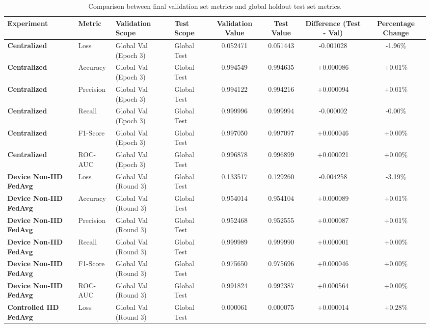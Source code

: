 \documentclass[11pt,a4paper]{article}
\begin{document}
\begin{table}[htbp]
\centering
\caption{Comparison between final validation set metrics and global holdout test set metrics.}
\begin{adjustbox}{width=\textwidth,center}
\begin{tabular}{l l l l c c c c}
\toprule
\textbf{Experiment} & \textbf{Metric} & \textbf{Validation Scope} & \textbf{Test Scope} & \textbf{Validation Value} & \textbf{Test Value} & \textbf{Difference (Test - Val)} & \textbf{Percentage Change} \\
\midrule
\textbf{Centralized} & Loss & Global Val (Epoch 3) & Global Test & 0.052471 & 0.051443 & -0.001028 & -1.96\% \\
\textbf{Centralized} & Accuracy & Global Val (Epoch 3) & Global Test & 0.994549 & 0.994635 & +0.000086 & +0.01\% \\
\textbf{Centralized} & Precision & Global Val (Epoch 3) & Global Test & 0.994122 & 0.994216 & +0.000094 & +0.01\% \\
\textbf{Centralized} & Recall & Global Val (Epoch 3) & Global Test & 0.999996 & 0.999994 & -0.000002 & -0.00\% \\
\textbf{Centralized} & F1-Score & Global Val (Epoch 3) & Global Test & 0.997050 & 0.997097 & +0.000046 & +0.00\% \\
\textbf{Centralized} & ROC-AUC & Global Val (Epoch 3) & Global Test & 0.996878 & 0.996899 & +0.000021 & +0.00\% \\
\textbf{Device Non-IID FedAvg} & Loss & Global Val (Round 3) & Global Test & 0.133517 & 0.129260 & -0.004258 & -3.19\% \\
\textbf{Device Non-IID FedAvg} & Accuracy & Global Val (Round 3) & Global Test & 0.954014 & 0.954104 & +0.000089 & +0.01\% \\
\textbf{Device Non-IID FedAvg} & Precision & Global Val (Round 3) & Global Test & 0.952468 & 0.952555 & +0.000087 & +0.01\% \\
\textbf{Device Non-IID FedAvg} & Recall & Global Val (Round 3) & Global Test & 0.999989 & 0.999990 & +0.000001 & +0.00\% \\
\textbf{Device Non-IID FedAvg} & F1-Score & Global Val (Round 3) & Global Test & 0.975650 & 0.975696 & +0.000046 & +0.00\% \\
\textbf{Device Non-IID FedAvg} & ROC-AUC & Global Val (Round 3) & Global Test & 0.991824 & 0.992387 & +0.000564 & +0.00\% \\
\textbf{Controlled IID FedAvg} & Loss & Global Val (Round 3) & Global Test & 0.000061 & 0.000075 & +0.000014 & +0.28\% \\

\end{tabular}
\end{adjustbox}
\end{table}
\end{document}
